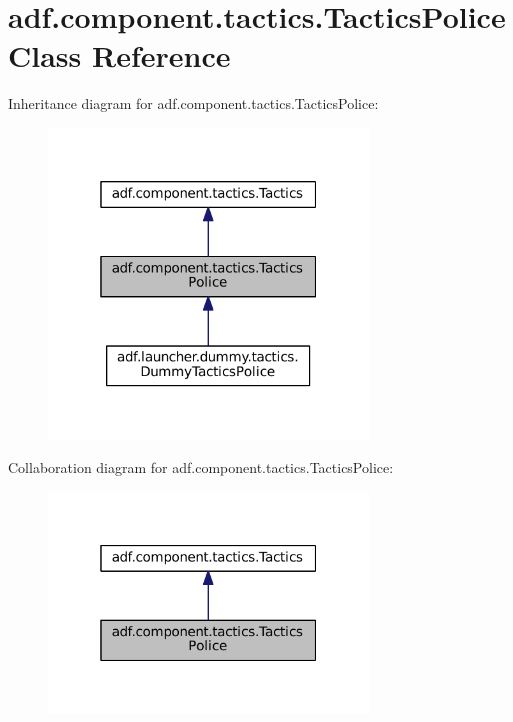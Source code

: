 \hypertarget{classadf_1_1component_1_1tactics_1_1TacticsPolice}{}\section{adf.\+component.\+tactics.\+Tactics\+Police Class Reference}
\label{classadf_1_1component_1_1tactics_1_1TacticsPolice}


Inheritance diagram for adf.\+component.\+tactics.\+Tactics\+Police\+:
\nopagebreak
\begin{figure}[H]
\begin{center}
\leavevmode
\includegraphics[width=241pt]{classadf_1_1component_1_1tactics_1_1TacticsPolice__inherit__graph}
\end{center}
\end{figure}


Collaboration diagram for adf.\+component.\+tactics.\+Tactics\+Police\+:
\nopagebreak
\begin{figure}[H]
\begin{center}
\leavevmode
\includegraphics[width=241pt]{classadf_1_1component_1_1tactics_1_1TacticsPolice__coll__graph}
\end{center}
\end{figure}
